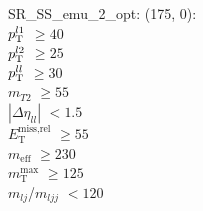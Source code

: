 SR\_SS\_emu\_2\_opt: (175, 0): \\
$p_{\text{T}}^{l1}$ $\geq 40$ \\
$p_{\text{T}}^{l2}$ $\geq 25$ \\
$p_{\text{T}}^{ll}$ $\geq 30$ \\
$m_{T2}$ $\geq 55$ \\
$|\Delta\eta_{ll}|$ $<1.5$ \\
$E_{\text{T}}^{\text{miss,rel}}$ $\geq 55$ \\
$m_{\text{eff}}$ $\geq 230$ \\
$m_{\text{T}}^{\text{max}}$ $\geq 125$ \\
$m_{lj}$/$m_{ljj}$ $<120$ \\
